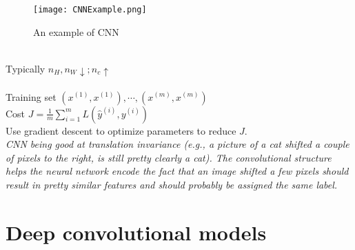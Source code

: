 \begin{figure}[h]
    \centering
    \texttt{[image: CNNExample.png]}
    \caption{An example of CNN}
    \label{fig:CNNExample}
\end{figure}
~\\
Typically $n_H, n_W \downarrow; n_c \uparrow$\\
\\
Training set $(x^{(1)}, x^{(1)}), \cdots, (x^{(m)}, x^{(m)})$\\
Cost $J = \frac{1}{m}\sum_{i=1}^{m}L(\hat{y}^{(i)}, y^{(i)})$\\
Use gradient descent to optimize parameters to reduce $J$.\\

\emph{\textcolor{Bittersweet}{CNN being good at translation invariance (e.g., a picture of a cat shifted a couple of pixels to the right, is still pretty clearly a cat). The convolutional structure helps the neural network encode the fact that an image shifted a few pixels should result in pretty similar features and should probably be assigned the same label.}}


\section{Deep convolutional models}

%

